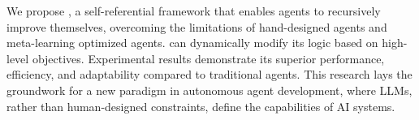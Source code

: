 We propose \framework, a self-referential framework that enables agents to recursively improve themselves, overcoming the limitations of hand-designed agents and meta-learning optimized agents.  \framework can dynamically modify its logic based on high-level objectives. Experimental results demonstrate its superior performance, efficiency, and adaptability compared to traditional agents. 
This research lays the groundwork for a new paradigm in autonomous agent development, where LLMs, rather than human-designed constraints, define the capabilities of AI systems. 

